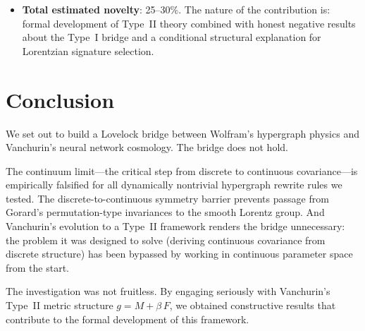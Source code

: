 \documentclass[11pt]{article}
\theoremstyle{definition}
\theoremstyle{remark}
\begin{document}
\begin{itemize}
\item \textbf{Total estimated novelty}: 25--30\%.
  The nature of the contribution is: formal development of Type~II
  theory combined with honest negative results about the Type~I
  bridge and a conditional structural explanation for Lorentzian
  signature selection.
\end{itemize}

\section{Conclusion}
\label{sec:conclusion}

We set out to build a Lovelock bridge between Wolfram's hypergraph
physics and Vanchurin's neural network cosmology.
The bridge does not hold.

The continuum limit---the critical step from discrete to continuous
covariance---is empirically falsified for all dynamically nontrivial
hypergraph rewrite rules we tested.
The discrete-to-continuous symmetry barrier prevents passage from
Gorard's permutation-type invariances to the smooth Lorentz group.
And Vanchurin's evolution to a Type~II framework renders the bridge
unnecessary: the problem it was designed to solve (deriving continuous
covariance from discrete structure) has been bypassed by working in
continuous parameter space from the start.

The investigation was not fruitless.
By engaging seriously with Vanchurin's Type~II metric structure
$g = M + \beta\,F$, we obtained constructive results that contribute
to the formal development of this framework.
\end{document}
